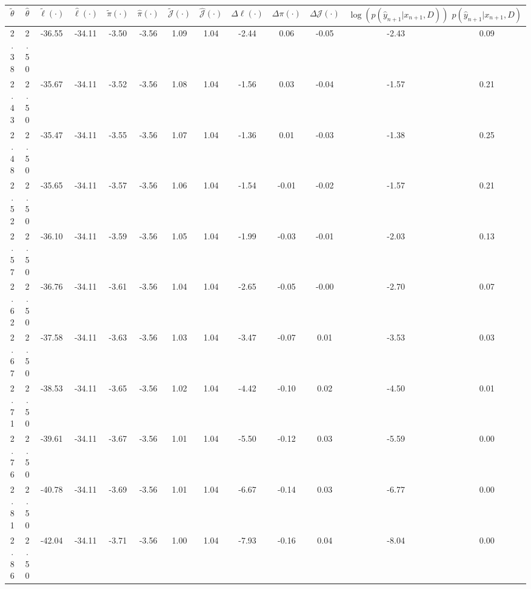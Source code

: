 \begin{table}[htbp]
        \centering
        \tiny
        \begin{adjustbox}{angle=90}
            \begin{tabular}{|c|c|c|c|c|c|c|c|c|c|c|c|c|}
                \hline
                 $\tilde{\theta}$ & $\hat{\theta}$ & $\tilde{\ell}(\cdot)$ & $\hat{\ell}(\cdot)$ & $\tilde{\pi}(\cdot)$ & $\hat{\pi}(\cdot)$ & $\tilde{\mathcal{J}}(\cdot)$ & $\hat{\mathcal{J}}(\cdot)$ & $\Delta \ell(\cdot)$ & $\Delta \pi(\cdot)$ & $\Delta \mathcal{J}(\cdot)$ & $\log(p(\hat{y}_{n+1}|x_{n+1}, D))$ & $p(\hat{y}_{n+1}|x_{n+1}, D)$ \\
                \hline
                 2.38 & 2.50 & -36.55 & -34.11 & -3.50 & -3.56 & 1.09 & 1.04 & -2.44 & 0.06 & -0.05 & -2.43 & 0.09\\ \hline
 2.43 & 2.50 & -35.67 & -34.11 & -3.52 & -3.56 & 1.08 & 1.04 & -1.56 & 0.03 & -0.04 & -1.57 & 0.21\\ \hline
 2.48 & 2.50 & -35.47 & -34.11 & -3.55 & -3.56 & 1.07 & 1.04 & -1.36 & 0.01 & -0.03 & -1.38 & 0.25\\ \hline
 2.52 & 2.50 & -35.65 & -34.11 & -3.57 & -3.56 & 1.06 & 1.04 & -1.54 & -0.01 & -0.02 & -1.57 & 0.21\\ \hline
 2.57 & 2.50 & -36.10 & -34.11 & -3.59 & -3.56 & 1.05 & 1.04 & -1.99 & -0.03 & -0.01 & -2.03 & 0.13\\ \hline
 2.62 & 2.50 & -36.76 & -34.11 & -3.61 & -3.56 & 1.04 & 1.04 & -2.65 & -0.05 & -0.00 & -2.70 & 0.07\\ \hline
 2.67 & 2.50 & -37.58 & -34.11 & -3.63 & -3.56 & 1.03 & 1.04 & -3.47 & -0.07 & 0.01 & -3.53 & 0.03\\ \hline
 2.71 & 2.50 & -38.53 & -34.11 & -3.65 & -3.56 & 1.02 & 1.04 & -4.42 & -0.10 & 0.02 & -4.50 & 0.01\\ \hline
 2.76 & 2.50 & -39.61 & -34.11 & -3.67 & -3.56 & 1.01 & 1.04 & -5.50 & -0.12 & 0.03 & -5.59 & 0.00\\ \hline
 2.81 & 2.50 & -40.78 & -34.11 & -3.69 & -3.56 & 1.01 & 1.04 & -6.67 & -0.14 & 0.03 & -6.77 & 0.00\\ \hline
 2.86 & 2.50 & -42.04 & -34.11 & -3.71 & -3.56 & 1.00 & 1.04 & -7.93 & -0.16 & 0.04 & -8.04 & 0.00\\ \hline
            \end{tabular}
        \end{adjustbox}
        \caption{}
        \label{}
    \end{table}
    